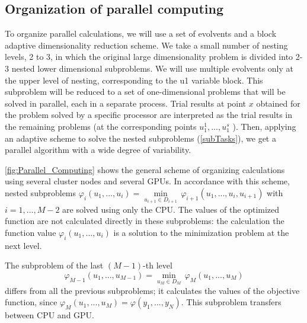 \documentclass{svproc}
\begin{document}
\subsection{Organization of parallel computing}

To organize parallel calculations, we will use a set of evolvents and a block adaptive dimensionality reduction scheme. We take a small number of nesting levels, 2 to 3, in which the original large dimensionality problem is divided into 2-3 nested lower dimensional subproblems. We will use multiple evolvents only at the upper level of nesting, corresponding to the u1 variable block. This subproblem will be reduced to a set of one-dimensional problems that will be solved in parallel, each in a separate process. Trial results at point $x$ obtained for the problem solved by a specific processor are interpreted as the trial results in the remaining problems (at the corresponding points \(u^1_1,..., u^s_1\) ).
Then, applying an adaptive scheme to solve the nested subproblems (\ref{subTasks}), we get a parallel algorithm with a wide degree of variability.

\ref{fig:Parallel_Computing} shows the general scheme of organizing calculations using several cluster nodes and several GPUs. In accordance with this scheme, nested subproblems  ${{\varphi }_{i}}({{u}_{1}},...,{{u}_{i}})=\underset{{{u}_{i+1}}\in {{D}_{i+1}}}{\mathop{\min }}\,{{\varphi }_{i+1}}({{u}_{1}},...,{{u}_{i}},{{u}_{i+1}})$  with \(i=1,\ldots ,M-2\) are solved using only the CPU. The values of the optimized function are not calculated directly in these subproblems: the calculation the function value  ${{\varphi }_{i}}({{u}_{1}},...,{{u}_{i}})$ is a solution to the minimization problem at the next level.

The subproblem of the last \((M - 1)\)-th level 
\[
{{\varphi }_{M-1}}({{u}_{1}},...,{{u}_{M-1}})=\underset{{{u}_{M}}\in {{D}_{M}}}{\mathop{\min }}\,{{\varphi }_{M}}({{u}_{1}},...,{{u}_{M}})
\]
 differs from all the previous subproblems; it calculates the values of the objective function, since ${{\varphi }_{M}}({{u}_{1}},...,{{u}_{M}})=\varphi ({{y}_{1}},...,{{y}_{N}})$. This subproblem transfers between CPU and GPU.
\end{document}
